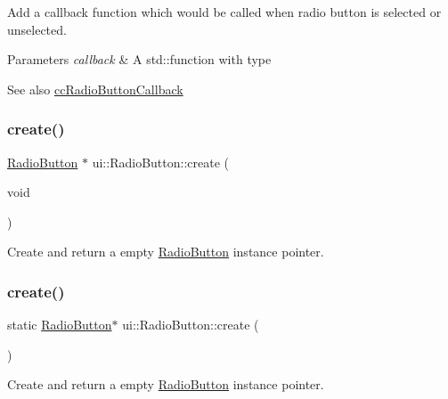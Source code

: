 Add a callback function which would be called when radio button is selected or unselected. 
\begin{DoxyParams}{Parameters}
{\em callback} & A std\+::function with type \\
\hline
\end{DoxyParams}
\begin{DoxySeeAlso}{See also}
{\ttfamily \hyperlink{classui_1_1RadioButton_a14dd0e15b76ab9ce823593a677cb777f}{cc\+Radio\+Button\+Callback}} 
\end{DoxySeeAlso}
\mbox{\label{classui_1_1RadioButton_ae963da2266050872da18d4f5cbc9aae8}} 
\subsubsection{\texorpdfstring{create()}{create()}\hspace{0.1cm}{\footnotesize\ttfamily [1/6]}}
{\footnotesize\ttfamily \hyperlink{classui_1_1RadioButton}{Radio\+Button} $\ast$ ui\+::\+Radio\+Button\+::create (\begin{DoxyParamCaption}\item[{void}]{ }\end{DoxyParamCaption})\hspace{0.3cm}{\ttfamily [static]}}

Create and return a empty \hyperlink{classui_1_1RadioButton}{Radio\+Button} instance pointer. \mbox{\label{classui_1_1RadioButton_af2666c6f2f2612d386ec8daad7404e61}} 
\subsubsection{\texorpdfstring{create()}{create()}\hspace{0.1cm}{\footnotesize\ttfamily [2/6]}}
{\footnotesize\ttfamily static \hyperlink{classui_1_1RadioButton}{Radio\+Button}$\ast$ ui\+::\+Radio\+Button\+::create (\begin{DoxyParamCaption}{ }\end{DoxyParamCaption})\hspace{0.3cm}{\ttfamily [static]}}

Create and return a empty \hyperlink{classui_1_1RadioButton}{Radio\+Button} instance pointer. \mbox{\label{classui_1_1RadioButton_adf995938f51bf1ece6ed0de96a4c15dc}} 
